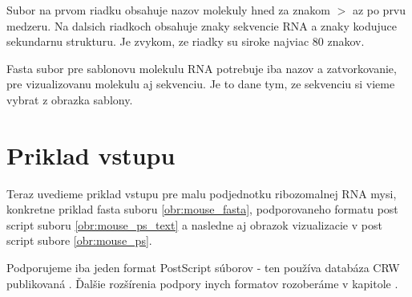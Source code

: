 Subor na prvom riadku obsahuje nazov molekuly hned za znakom $>$ az po prvu medzeru.
Na dalsich riadkoch obsahuje znaky sekvencie RNA a znaky kodujuce sekundarnu strukturu.
Je zvykom, ze riadky su siroke najviac 80 znakov.

Fasta subor pre sablonovu molekulu RNA potrebuje iba nazov a zatvorkovanie, pre
vizualizovanu molekulu aj sekvenciu. Je to dane tym, ze sekvenciu si vieme vybrat z obrazka sablony.

\section{Priklad vstupu}

Teraz uvedieme priklad vstupu pre malu podjednotku ribozomalnej RNA mysi, konkretne priklad
fasta suboru \ref{obr:mouse_fasta}, podporovaneho formatu post script suboru \ref{obr:mouse_ps_text}
a nasledne aj obrazok vizualizacie v post script subore \ref{obr:mouse_ps}.

\begin{pozn}
  Podporujeme iba jeden format PostScript súborov - ten používa databáza CRW publikovaná \citet{CRW}.
  Ďalšie rozšírenia podpory inych formatov rozoberáme v kapitole .
\end{pozn}

